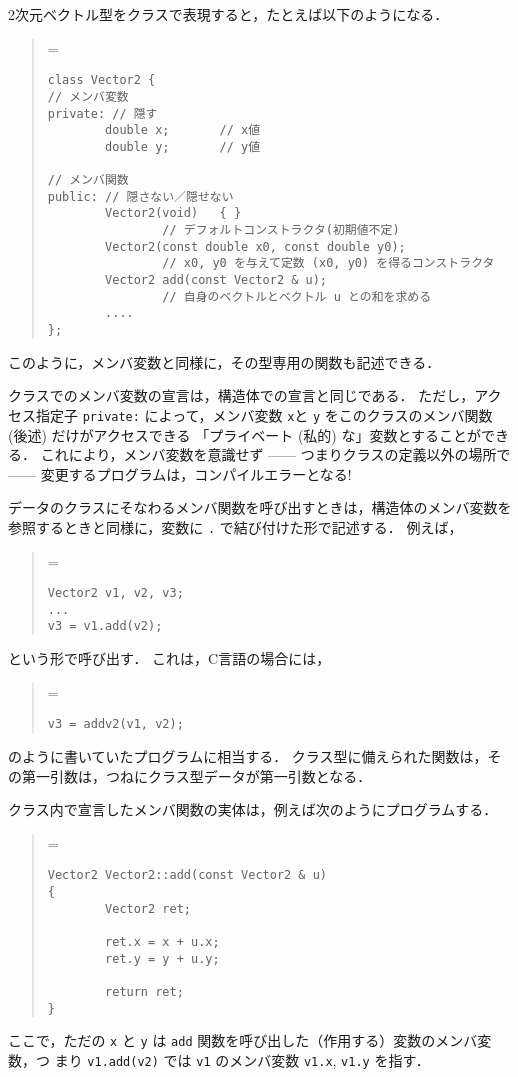 \documentclass[11pt,a4,epsf]{jarticle}
\def\linesparpage#1{\baselineskip=\textheight\divide\baselineskip#1}
\begin{document}
2次元ベクトル型をクラスで表現すると，たとえば以下のようになる．
\begin{quote}
\linesparpage{50}
\begin{verbatim}
class Vector2 {
// メンバ変数
private: // 隠す
        double x;       // x値
        double y;       // y値

// メンバ関数
public: // 隠さない／隠せない
        Vector2(void)   { }
                // デフォルトコンストラクタ(初期値不定)
        Vector2(const double x0, const double y0);
                // x0, y0 を与えて定数 (x0, y0) を得るコンストラクタ
        Vector2 add(const Vector2 & u);
                // 自身のベクトルとベクトル u との和を求める
        ....
};
\end{verbatim}
\end{quote}
このように，メンバ変数と同様に，その型専用の関数も記述できる．

クラスでのメンバ変数の宣言は，構造体での宣言と同じである．
ただし，アクセス指定子 \verb+private:+ によって，メンバ変数 \verb+x+と
\verb+y+ をこのクラスのメンバ関数 (後述) だけがアクセスできる
「プライベート (私的) な」変数とすることができる．
これにより，メンバ変数を意識せず ------ 
つまりクラスの定義以外の場所で ------ 変更するプログラムは，コンパイルエラーとなる!

データのクラスにそなわるメンバ関数を呼び出すときは，構造体のメンバ変数を参照するときと同様に，変数に \verb+.+ で結び付けた形で記述する．
例えば，
\begin{quote}
\linesparpage{50}
\begin{verbatim}
Vector2 v1, v2, v3;
...
v3 = v1.add(v2);
\end{verbatim}
\end{quote}
という形で呼び出す．
これは，C言語の場合には，
\begin{quote}
\linesparpage{50}
\begin{verbatim}
v3 = addv2(v1, v2);
\end{verbatim}
\end{quote}
のように書いていたプログラムに相当する．
クラス型に備えられた関数は，その第一引数は，つねにクラス型データが第一引数となる．

クラス内で宣言したメンバ関数の実体は，例えば次のようにプログラムする．
\begin{quote}
\linesparpage{50}
\begin{verbatim}
Vector2 Vector2::add(const Vector2 & u)
{
        Vector2 ret;

        ret.x = x + u.x;
        ret.y = y + u.y;

        return ret;
}
\end{verbatim}
\end{quote}
ここで，ただの \verb+x+ と \verb+y+ は
 \verb+add+ 関数を呼び出した（作用する）変数のメンバ変数，つ
まり \verb+v1.add(v2)+ では \verb+v1+ のメンバ変数 \verb+v1.x+,
\verb+v1.y+ を指す．
\end{document}
